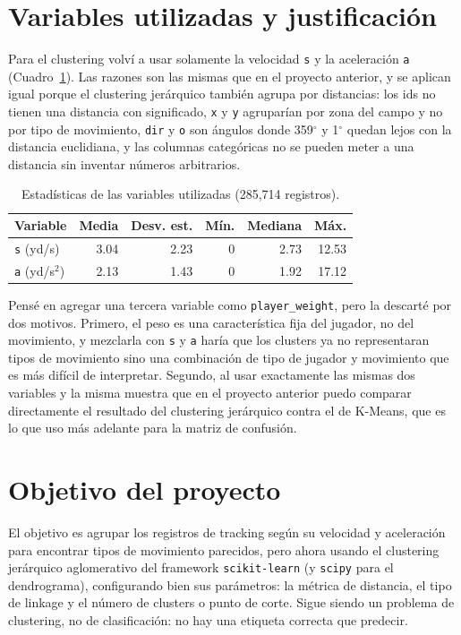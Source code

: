 \documentclass[11pt,a4paper]{article}
\begin{document}
\section{Variables utilizadas y justificación}

Para el clustering volví a usar solamente la velocidad \texttt{s} y la aceleración \texttt{a} (Cuadro~\ref{tab:vars}). Las razones son las mismas que en el proyecto anterior, y se aplican igual porque el clustering jerárquico también agrupa por distancias: los ids no tienen una distancia con significado, \texttt{x} y \texttt{y} agruparían por zona del campo y no por tipo de movimiento, \texttt{dir} y \texttt{o} son ángulos donde 359$^\circ$ y 1$^\circ$ quedan lejos con la distancia euclidiana, y las columnas categóricas no se pueden meter a una distancia sin inventar números arbitrarios.

\begin{table}[H]
  \centering
  \begin{tabular}{lrrrrr}
    \toprule
    Variable & Media & Desv. est. & Mín. & Mediana & Máx. \\
    \midrule
    \texttt{s} (yd/s)     & 3.04 & 2.23 & 0 & 2.73 & 12.53 \\
    \texttt{a} (yd/s$^2$) & 2.13 & 1.43 & 0 & 1.92 & 17.12 \\
    \bottomrule
  \end{tabular}
  \caption{Estadísticas de las variables utilizadas (285{,}714 registros).}
  \label{tab:vars}
\end{table}

Pensé en agregar una tercera variable como \texttt{player\_weight}, pero la descarté por dos motivos. Primero, el peso es una característica fija del jugador, no del movimiento, y mezclarla con \texttt{s} y \texttt{a} haría que los clusters ya no representaran tipos de movimiento sino una combinación de tipo de jugador y movimiento que es más difícil de interpretar. Segundo, al usar exactamente las mismas dos variables y la misma muestra que en el proyecto anterior puedo comparar directamente el resultado del clustering jerárquico contra el de K-Means, que es lo que uso más adelante para la matriz de confusión.

\section{Objetivo del proyecto}

El objetivo es agrupar los registros de tracking según su velocidad y aceleración para encontrar tipos de movimiento parecidos, pero ahora usando el clustering jerárquico aglomerativo del framework \texttt{scikit-learn} (y \texttt{scipy} para el dendrograma), configurando bien sus parámetros: la métrica de distancia, el tipo de linkage y el número de clusters o punto de corte. Sigue siendo un problema de clustering, no de clasificación: no hay una etiqueta correcta que predecir.
\end{document}
